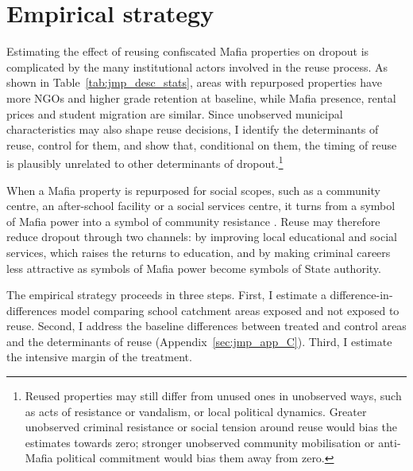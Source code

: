 \documentclass[12pt]{article}
\theoremstyle{plain}
\theoremstyle{plain}
\theoremstyle{plain}
\theoremstyle{definition}
\theoremstyle{plain}
\theoremstyle{definition}
\theoremstyle{plain}
\theoremstyle{remark}
\theoremstyle{definition}
\theoremstyle{definition}
\theoremstyle{plain}
\begin{document}
\section{Empirical strategy}
\label{sec:jmp_empirical}
Estimating the effect of reusing confiscated Mafia properties on dropout is complicated by the many institutional actors involved in the reuse process. As shown in Table~\ref{tab:jmp_desc_stats}, areas with repurposed properties have more NGOs and higher grade retention at baseline, while Mafia presence, rental prices and student migration are similar. Since unobserved municipal characteristics may also shape reuse decisions, I identify the determinants of reuse, control for them, and show that, conditional on them, the timing of reuse is plausibly unrelated to other determinants of dropout.\footnote{Reused properties may still differ from unused ones in unobserved ways, such as acts of resistance or vandalism, or local political dynamics. Greater unobserved criminal resistance or social tension around reuse would bias the estimates towards zero; stronger unobserved community mobilisation or anti-Mafia political commitment would bias them away from zero.}

When a Mafia property is repurposed for social scopes, such as a community centre, an after-school facility or a social services centre, it turns from a symbol of Mafia power into a symbol of community resistance \citep{mosca_social_2017}. Reuse may therefore reduce dropout through two channels: by improving local educational and social services, which raises the returns to education, and by making criminal careers less attractive as symbols of Mafia power become symbols of State authority.

The empirical strategy proceeds in three steps. First, I estimate a difference-in-differences model comparing school catchment areas exposed and not exposed to reuse. Second, I address the baseline differences between treated and control areas and the determinants of reuse (Appendix~\ref{sec:jmp_app_C}). Third, I estimate the intensive margin of the treatment. \par
\FloatBarrier
\end{document}
